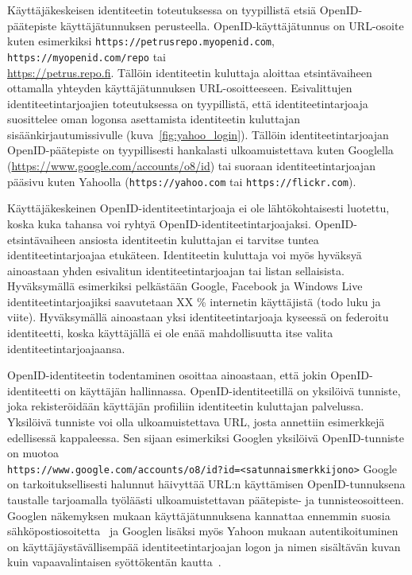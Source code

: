\documentclass[finnish,gradu]{tktltiki}
\begin{document}
  Käyttäjäkeskeisen identiteetin toteutuksessa on tyypillistä etsiä OpenID-päätepiste käyttäjätunnuksen perusteella. OpenID-käyttäjätunnus on URL-osoite kuten esimerkiksi \verb!https://petrusrepo.myopenid.com!, \verb!https://myopenid.com/repo! tai
  \\ \url{https://petrus.repo.fi}. Tällöin identiteetin kuluttaja aloittaa etsintävaiheen ottamalla yhteyden käyttäjätunnuksen URL-osoitteeseen. Esivalittujen identiteetintarjoajien toteutuksessa on tyypillistä, että identiteetintarjoaja suosittelee oman logonsa asettamista identiteetin kuluttajan sisäänkirjautumissivulle (kuva~\ref{fig:yahoo_login}). Tällöin identiteetintarjoajan OpenID-päätepiste on tyypillisesti hankalasti ulkoamuistettava kuten Googlella
  \\ (\url{https://www.google.com/accounts/o8/id}) tai suoraan identiteetintarjoajan pääsivu kuten Yahoolla (\verb!https://yahoo.com! tai \verb!https://flickr.com!).

  Käyttäjäkeskeinen OpenID-identiteetintarjoaja ei ole lähtökohtaisesti luotettu, koska kuka tahansa voi ryhtyä OpenID-identiteetintarjoajaksi. OpenID-etsintävaiheen ansiosta identiteetin kuluttajan ei tarvitse tuntea identiteetintarjoajaa etukäteen. Identiteetin kuluttaja voi myös hyväksyä ainoastaan yhden esivalitun identiteetintarjoajan tai listan sellaisista. Hyväksymällä esimerkiksi pelkästään Google, Facebook ja Windows Live identiteetintarjoajiksi saavutetaan XX \% internetin käyttäjistä (todo luku ja viite). Hyväksymällä ainoastaan yksi identiteetintarjoaja kyseessä on federoitu identiteetti, koska käyttäjällä ei ole enää mahdollisuutta itse valita identiteetintarjoajaansa.

   OpenID-identiteetin todentaminen osoittaa ainoastaan, että jokin OpenID-identiteetti on käyttäjän hallinnassa. OpenID-identiteetillä on yksilöivä tunniste, joka rekisteröidään käyttäjän profiiliin identiteetin kuluttajan palvelussa. Yksilöivä tunniste voi olla ulkoamuistettava URL, josta annettiin esimerkkejä edellisessä kappaleessa. Sen sijaan esimerkiksi Googlen yksilöivä OpenID-tunniste on muotoa
  \\ \verb#https://www.google.com/accounts/o8/id?id=<satunnaismerkkijono>#
  Google on tarkoituksellisesti halunnut häivyttää URL:n käyttämisen OpenID-tunnuksena taustalle tarjoamalla työläästi ulkoamuistettavan päätepiste- ja tunnisteosoitteen. Googlen näkemyksen mukaan käyttäjätunnuksena kannattaa ennemmin suosia sähköpostiosoitetta~\cite{google_best_practices_authentication} ja Googlen lisäksi myös Yahoon mukaan autentikoituminen on käyttäjäystävällisempää identiteetintarjoajan logon ja nimen sisältävän kuvan kuin vapaavalintaisen syöttökentän kautta~\cite{google_usability_federated_login, yahoo_usability_openid_2008, google_thoughts_combining_ux_2008a}.
\end{document}
